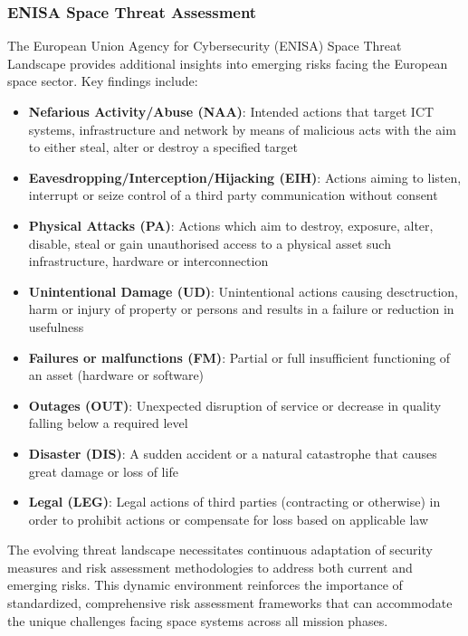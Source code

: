 \documentclass[binding=0.6cm]{sapthesis}
\begin{document}
\subsubsection{ENISA Space Threat Assessment}

The European Union Agency for Cybersecurity (ENISA) Space Threat Landscape provides additional insights into emerging risks facing the European space sector. Key findings include:

\begin{itemize}
    \item \textbf{Nefarious Activity/Abuse (NAA)}: Intended actions that target ICT systems, infrastructure and network by means of malicious acts with the aim to either steal, alter or destroy a specified target
    \item \textbf{Eavesdropping/Interception/Hijacking (EIH)}: Actions aiming to listen, interrupt or seize control of a third party communication without consent
    \item \textbf{Physical Attacks (PA)}: Actions which aim to destroy, exposure, alter, disable, steal or gain unauthorised access to a physical asset such infrastructure, hardware or interconnection
    \item \textbf{Unintentional Damage (UD)}: Unintentional actions causing desctruction, harm or injury of property or persons and results in a failure or reduction in usefulness
    \item \textbf{Failures or malfunctions (FM)}: Partial or full insufficient functioning of an asset (hardware or software) 
    \item \textbf{Outages (OUT)}: Unexpected disruption of service or decrease in quality falling below a required level 
    \item \textbf{Disaster (DIS)}: A sudden accident or a natural catastrophe that causes great damage or loss of life
    \item \textbf{Legal (LEG)}: Legal actions of third parties (contracting or otherwise) in order to prohibit actions or compensate for loss based on applicable law
\end{itemize}

The evolving threat landscape necessitates continuous adaptation of security measures and risk assessment methodologies to address both current and emerging risks. This dynamic environment reinforces the importance of standardized, comprehensive risk assessment frameworks that can accommodate the unique challenges facing space systems across all mission phases.
\end{document}
